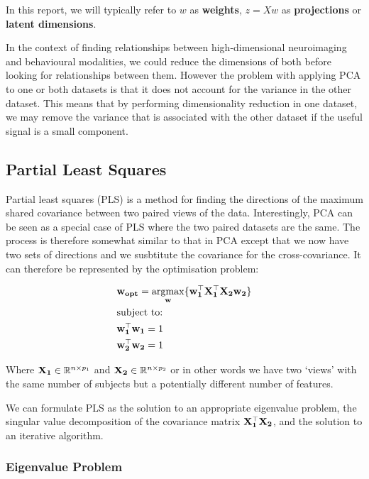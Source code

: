 In this report, we will typically refer to $w$ as \textbf{weights}, $z=Xw$ as \textbf{projections} or \textbf{latent dimensions}.

In the context of finding relationships between high-dimensional neuroimaging and behavioural modalities, we could reduce the dimensions of both before looking for relationships between them. However the problem with applying PCA to one or both datasets is that it does not account for the variance in the other dataset. This means that by performing dimensionality reduction in one dataset, we may remove the variance that is associated with the other dataset if the useful signal is a small component.

\subsection{Partial Least Squares}

Partial least squares (PLS) is a method for finding the directions of the maximum shared covariance between two paired views of the data. Interestingly, PCA can be seen as a special case of PLS where the two paired datasets are the same. The process is therefore somewhat similar to that in PCA except that we now have two sets of directions and we susbtitute the covariance for the cross-covariance. It can therefore be represented by the optimisation problem:

\begin{align}
     & \bold{w_{opt}}=\underset{\bold{w}}{\mathrm{argmax}}\{ \bold{w_1^{\top}X_1^{\top}X_2w_2}  \} \\
     & \text{subject to:} \notag                                                                   \\
     & \bold{w_1^{\top}w_1}=1 \notag                                                               \\
     & \bold{w_2^{\top}w_2}=1 \notag
\end{align}

Where $\bold{X_1} \in \mathbb{R}^{n \times p_1}$ and $\bold{X_2} \in \mathbb{R}^{n \times p_2}$ or in other words we have two `views' with the same number of subjects but a potentially different number of features.

We can formulate PLS as the solution to an appropriate eigenvalue problem, the singular value decomposition of the covariance matrix $\bold{X_1^{\top}X_2}$, and the solution to an iterative algorithm.

\subsubsection{Eigenvalue Problem}

